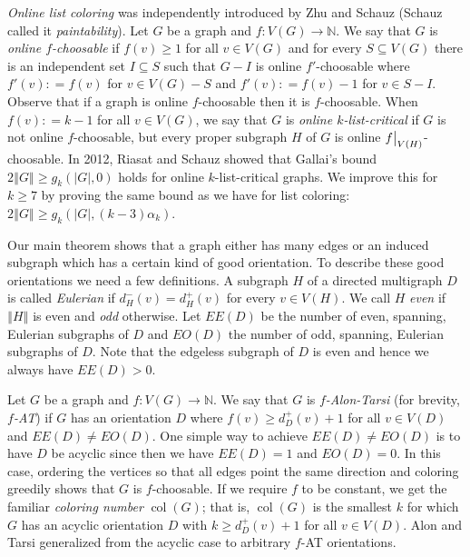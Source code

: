 \documentclass[12pt]{article}
\theoremstyle{plain}
\theoremstyle{definition}
\theoremstyle{remark}
\newcommand{\IN}{\mathbb{N}}
\newcommand{\card}[1]{\left|#1\right|}
\newcommand{\size}[1]{\left\Vert#1\right\Vert}
\newcommand{\func}[3]{#1\colon #2 \rightarrow #3}
\newcommand{\DefinedAs}{\mathrel{\mathop:}=}
\newcommand{\col}{\operatorname{col}}
\newcommand\restr[2]{{%
  \left.\kern-\nulldelimiterspace %
  #1 %
  \vphantom{\big|} %
  \right|_{#2} %
  }}
\begin{document}
\emph{Online list coloring} was independently introduced by Zhu \cite{zhu2009online} and Schauz \cite{schauz2009mr} (Schauz called it \emph{paintability}). Let $G$ be a graph and $\func{f}{V(G)}{\IN}$.  We say that $G$ is \emph{online $f$-choosable} if $f(v) \ge 1$ for all $v \in V(G)$ and for every $S \subseteq V(G)$ there is an independent set $I \subseteq S$ such that $G-I$ is online $f'$-choosable where $f'(v) \DefinedAs f(v)$ for $v \in V(G) - S$ and $f'(v) \DefinedAs f(v) - 1$ for $v \in S - I$.
Observe that if a graph is online $f$-choosable then it is $f$-choosable. 
When $f(v) \DefinedAs k-1$ for all $v \in V(G)$, we say that $G$ is \emph{online $k$-list-critical} if $G$ is not online $f$-choosable, 
but every proper subgraph $H$ of $G$ is online $\restr{f}{V(H)}$-choosable.  In 2012, Riasat and Schauz \cite{riasat2012critically} showed that Gallai's bound  $2\size{G} \ge g_k(\card{G}, 0)$ holds for online $k$-list-critical graphs.  We improve this for $k \ge 7$ by proving the same bound as we have for list coloring: $2\size{G} \ge g_k(\card{G}, (k-3)\alpha_k)$.

Our main theorem shows that a graph either has many edges or an induced subgraph which has a certain kind of good orientation.  To describe these good orientations we need a few definitions. A subgraph $H$ of a directed multigraph $D$ is called \emph{Eulerian} if $d^-_H(v) = d^+_H(v)$ for every $v \in V(H)$.  We call $H$ \emph{even} if $\size{H}$ is even and \emph{odd} otherwise.  Let $EE(D)$ be the number of even, spanning, Eulerian subgraphs of $D$ and $EO(D)$ the number of odd, spanning, Eulerian subgraphs of $D$.  Note that the edgeless subgraph of $D$ is even and hence we always have $EE(D) > 0$.

Let $G$ be a graph and $\func{f}{V(G)}{\IN}$.  We say that $G$ is \emph{$f$-Alon-Tarsi} (for brevity, \emph{$f$-AT}) if $G$ has an orientation $D$ where $f(v) \ge d_{D}^+(v) + 1$ for all $v \in V(D)$ and $EE(D) \ne EO(D)$. One simple way to achieve $EE(D) \ne EO(D)$ is to have $D$ be acyclic since then we have $EE(D) = 1$ and $EO(D) = 0$.  In this case, ordering the vertices so that all edges point the same direction and coloring greedily shows that $G$ is $f$-choosable. If we require $f$ to be constant, we get the familiar \emph{coloring number} $\col(G)$; that is, $\col(G)$ is the smallest $k$ for which $G$ has an acyclic orientation $D$ with $k \ge d_{D}^+(v) + 1$ for all $v \in V(D)$.  Alon and Tarsi \cite{Alon1992125} generalized from the acyclic case to arbitrary $f$-AT orientations.
\end{document}

